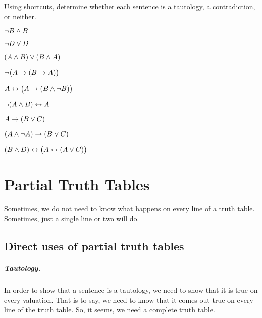 

\practiceproblems
\problempart
\label{pr.TT.TTorCS}
Using shortcuts, determine whether each sentence is a tautology, a contradiction, or neither. 
\begin{earg}
\item $\neg B \wedge B$ %
\item $\neg D \vee D$ %
\item $(A\wedge B) \vee (B\wedge A)$ %
\item $\neg\bigl(A \rightarrow (B \rightarrow A) \bigr)$ %
\item $A \leftrightarrow \bigl(A \rightarrow (B \wedge \neg B) \bigr)$ %
\item $\neg(A\wedge B) \leftrightarrow A$ %
\item $A\rightarrow(B\vee C)$ %
\item $(A \wedge\neg A) \rightarrow (B \vee C)$ %
\item $(B\wedge D) \leftrightarrow \bigl(A \leftrightarrow(A \vee C) \bigr)$%
\end{earg}


\chapter{Partial Truth Tables}\label{s:PartialTruthTable}

Sometimes, we do not need to know what happens on every line of a truth table. Sometimes, just a single line or two will do. 

\section{Direct uses of partial truth tables}\label{s:directPartialTruthTable}

\paragraph{Tautology.} 
In order to show that a sentence is a tautology, we need to show that it is true on every valuation. That is to say, we need to know that it comes out true on every line of the truth table. So, it seems, we need a complete truth table. 

